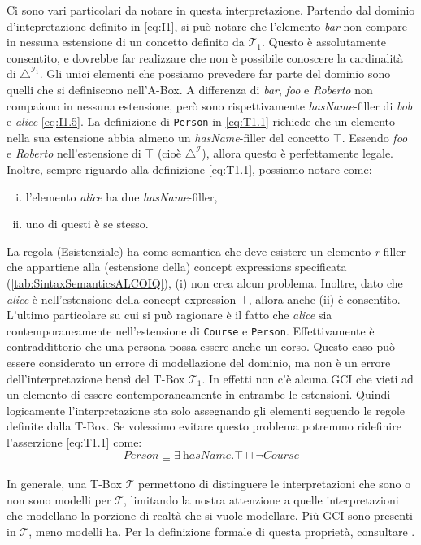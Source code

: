 Ci sono vari particolari da notare in questa interpretazione. Partendo dal dominio d'intepretazione definito in \eqref{eq:I1}, si può notare che l'elemento \textit{bar} non compare in nessuna estensione di un concetto definito da $\mathcal{T}_1$. Questo è assolutamente consentito, e dovrebbe far realizzare che non è possibile conoscere la cardinalità di $\triangle^{\mathcal{I}_1}$. Gli unici elementi che possiamo prevedere far parte del dominio sono quelli che si definiscono nell'A-Box. A differenza di \textit{bar}, \textit{foo} e \textit{Roberto} non compaiono in nessuna estensione, però sono rispettivamente \textit{hasName}-filler di \textit{bob} e \textit{alice} \eqref{eq:I1.5}. La definizione di \texttt{Person} in \eqref{eq:T1.1} richiede che un elemento nella sua estensione abbia almeno un \textit{hasName}-filler del concetto $\top$. Essendo \textit{foo} e \textit{Roberto} nell'estensione di $\top$ (cioè $\triangle^\mathcal{I}$), allora questo è perfettamente legale. Inoltre, sempre riguardo alla definizione \eqref{eq:T1.1}, possiamo notare come:
\begin{enumerate}[(i)]
	\item l'elemento \textit{alice} ha due \textit{hasName}-filler,
	\item uno di questi è se stesso.
\end{enumerate}
La regola (Esistenziale) ha come semantica che deve esistere un elemento \textit{r}-filler che appartiene alla (estensione della) concept expressions specificata (\autoref{tab:SintaxSemanticsALCOIQ}), (i) non crea alcun problema. Inoltre, dato che \textit{alice} è nell'estensione della concept expression $\top$, allora anche (ii) è consentito.\\
L'ultimo particolare su cui si può ragionare è il fatto che \textit{alice} sia contemporaneamente nell'estensione di \texttt{Course} e \texttt{Person}. Effettivamente è contraddittorio che una persona possa essere anche un corso. Questo caso può essere considerato un errore di modellazione del dominio, ma non è un errore dell'interpretazione bensì del T-Box $\mathcal{T}_1$. In effetti non c'è alcuna GCI che vieti ad un elemento di essere contemporaneamente in entrambe le estensioni. Quindi logicamente l'interpretazione sta solo assegnando gli elementi seguendo le regole definite dalla T-Box. Se volessimo evitare questo problema potremmo ridefinire l'asserzione \eqref{eq:T1.1} come:
\[ Person \sqsubseteq \exists\ \textit{hasName}.\top \sqcap \neg Course \]
\\
In generale, una T-Box $\mathcal{T}$ permettono di distinguere le interpretazioni che sono o non sono modelli per $\mathcal{T}$, limitando la nostra attenzione a quelle interpretazioni che modellano la porzione di realtà che si vuole modellare. Più GCI sono presenti in $\mathcal{T}$, meno modelli ha. Per la definizione formale di questa proprietà, consultare \cite{baader2017introductionDL}.
